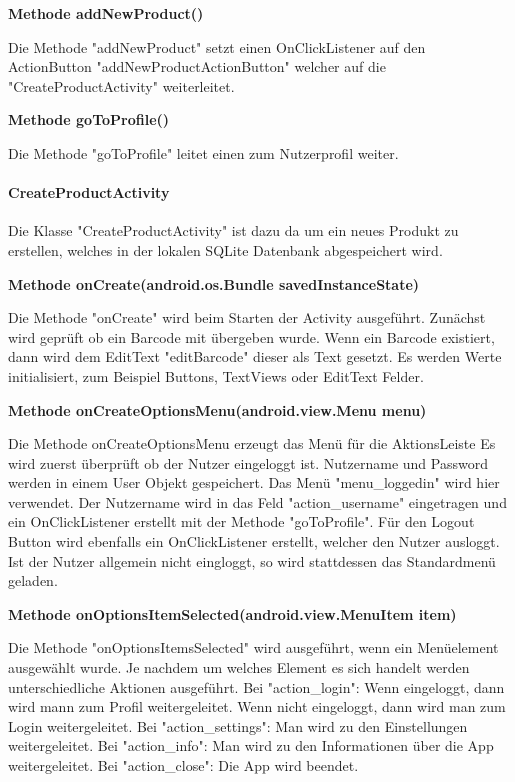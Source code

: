 \documentclass{scrartcl}
\begin{document}
\noindent\textbf{Methode addNewProduct()} 

\noindent Die Methode "addNewProduct" setzt einen OnClickListener auf den ActionButton "addNewProductActionButton" welcher auf die "CreateProductActivity" weiterleitet. \newline

\noindent\textbf{Methode goToProfile()} 

\noindent Die Methode "goToProfile" leitet einen zum Nutzerprofil weiter. \newline

\paragraph{CreateProductActivity}

Die Klasse "CreateProductActivity" ist dazu da um ein neues Produkt zu erstellen, welches in der lokalen SQLite Datenbank abgespeichert wird. \newline

\noindent\textbf{Methode onCreate(android.os.Bundle savedInstanceState)} 

\noindent Die Methode "onCreate" wird beim Starten der Activity ausgeführt. Zunächst wird geprüft ob ein Barcode mit übergeben wurde. Wenn ein Barcode existiert, dann wird dem EditText "editBarcode" dieser als Text gesetzt. Es werden Werte initialisiert, zum Beispiel Buttons, TextViews oder EditText Felder. \newline

\noindent\textbf{Methode onCreateOptionsMenu(android.view.Menu menu)} 

\noindent Die Methode onCreateOptionsMenu erzeugt das Menü für die AktionsLeiste Es wird zuerst überprüft ob der Nutzer eingeloggt ist. Nutzername und Password werden in einem User Objekt gespeichert. Das Menü "menu\_loggedin" wird hier verwendet. Der Nutzername wird in das Feld "action\_username" eingetragen und ein OnClickListener erstellt mit der Methode "goToProfile". Für den Logout Button wird ebenfalls ein OnClickListener erstellt, welcher den Nutzer ausloggt. Ist der Nutzer allgemein nicht eingloggt, so wird stattdessen das Standardmenü geladen. \newline

\noindent\textbf{Methode onOptionsItemSelected(android.view.MenuItem item)} 

\noindent Die Methode "onOptionsItemsSelected" wird ausgeführt, wenn ein Menüelement ausgewählt wurde. Je nachdem um welches Element es sich handelt werden unterschiedliche Aktionen ausgeführt. Bei "action\_login": Wenn eingeloggt, dann wird mann zum Profil weitergeleitet. Wenn nicht eingeloggt, dann wird man zum Login weitergeleitet. Bei "action\_settings": Man wird zu den Einstellungen weitergeleitet. Bei "action\_info": Man wird zu den Informationen über die App weitergeleitet. Bei "action\_close": Die App wird beendet. \newline
\end{document}
